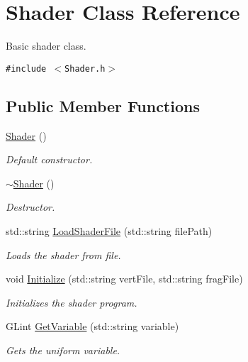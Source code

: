 \hypertarget{class_shader}{
\section{Shader Class Reference}
\label{class_shader}
}
Basic shader class.  


{\tt \#include $<$Shader.h$>$}

\subsection*{Public Member Functions}
\begin{CompactItemize}
\item 
\hyperlink{class_shader_0d654ebaca4e0555197c0724c6d30610}{Shader} ()
\begin{CompactList}\small\item\em Default constructor. \item\end{CompactList}\item 
\hyperlink{class_shader_ff01df87e8a102f270b5b135a295e59d}{$\sim$Shader} ()
\begin{CompactList}\small\item\em Destructor. \item\end{CompactList}\item 
std::string \hyperlink{class_shader_c843ecd8274ea7507df0edf2f4e6a794}{LoadShaderFile} (std::string filePath)
\begin{CompactList}\small\item\em Loads the shader from file. \item\end{CompactList}\item 
void \hyperlink{class_shader_10a1c46813a799c87556aa38a96007e7}{Initialize} (std::string vertFile, std::string fragFile)
\begin{CompactList}\small\item\em Initializes the shader program. \item\end{CompactList}\item 
GLint \hyperlink{class_shader_1230582b9f5d71bde3614683244e1a83}{GetVariable} (std::string variable)
\begin{CompactList}\small\item\em Gets the uniform variable. \item\end{CompactList}\item 

\end{CompactItemize}
